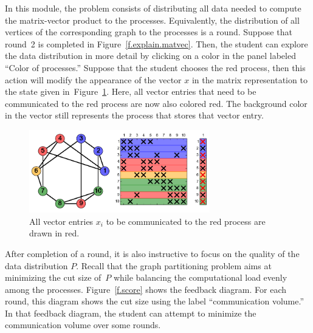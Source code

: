 \documentclass[12pt, twoside,a4paper,toc=bibliography]{scrbook}
\newcommand{\figref}[1]{Figure~\protect\ref{#1}}
\begin{document}
In this module, the problem consists of distributing all data needed to
compute the matrix-vector product to the processes. Equivalently, the distribution of all
vertices of the corresponding graph to the processes is a round. Suppose that round~2 is
completed in \figref{f.explain.matvec}. Then, the student can explore the data distribution in
more detail by clicking on a color in the panel labeled ``Color of processes.'' Suppose
that the student chooses the red process, then this action will modify the appearance of
the vector $x$ in the matrix representation to the state given
in~\figref{f.communication}. Here, all vector entries that need to be communicated to the
red process are now also colored red. 
The background color in the vector still represents the process
that stores that vector entry. 

\begin{figure}
\centering
\includegraphics[width=0.7\textwidth]{redComm}
\caption{All vector entries $x_i$ to be communicated to the red process are drawn in red.}
\label{f.communication}
\end{figure}

After completion of a round, it is also instructive to focus on the quality of the data
distribution $P$. Recall that the graph partitioning problem aims at minimizing the cut
size of~$P$ while balancing the computational load evenly among the processes. 
\figref{f.score} shows the feedback diagram. For each round, this diagram shows the cut size
using the label ``communication volume.''
In that feedback diagram, the student can attempt to minimize the communication volume over some rounds.
\end{document}
